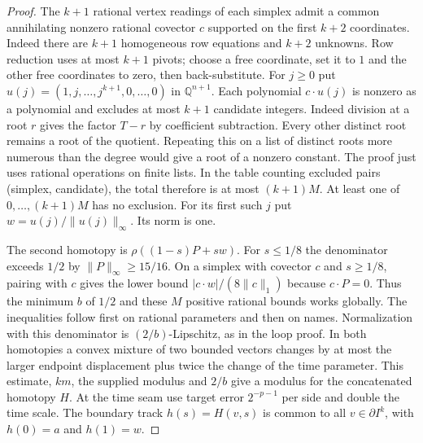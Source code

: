 \begin{proof}
The $k+1$ rational vertex readings of each simplex admit a common
annihilating nonzero rational covector $c$ supported on the first $k+2$
coordinates. Indeed there are $k+1$ homogeneous row equations and $k+2$
unknowns. Row reduction uses at most $k+1$ pivots; choose a free coordinate,
set it to $1$ and the other free coordinates to zero, then back-substitute.
For $j\ge0$ put $u(j)=(1,j,\ldots,j^{k+1},0,\ldots,0)$ in
$\mathbb Q^{n+1}$. Each polynomial $c\cdot u(j)$ is nonzero as a
polynomial and excludes at most $k+1$ candidate integers. Indeed division
at a root $r$ gives the factor $T-r$ by coefficient subtraction. Every
other distinct root remains a root of the quotient. Repeating this on a
list of distinct roots more numerous than the degree would give a root of
a nonzero constant. The proof just uses rational operations on finite
lists. In the table counting excluded pairs (simplex, candidate), the
total therefore is at most $(k+1)M$. At least one of
$0,\ldots,(k+1)M$ has no exclusion. For its first such $j$ put
$w=u(j)/\|u(j)\|_\infty$. Its norm is one.

The second homotopy is $\rho((1-s)P+sw)$. For $s\le1/8$ the
denominator exceeds $1/2$ by $\|P\|_\infty\ge15/16$. On a simplex with
covector $c$ and $s\ge1/8$, pairing with $c$ gives the lower bound
$|c\cdot w|/(8\|c\|_1)$ because $c\cdot P=0$. Thus the minimum $b$ of
$1/2$ and these $M$ positive rational bounds works globally. The
inequalities follow first on rational parameters and then on names.
Normalization with this denominator is $(2/b)$-Lipschitz, as in the loop
proof. In both homotopies a convex mixture of two bounded vectors changes
by at most the larger endpoint displacement plus twice the change of the
time parameter. This estimate, $km$, the supplied modulus and $2/b$
give a modulus for the concatenated homotopy $H$. At the time seam use
target error $2^{-p-1}$ per side and double the time scale. The boundary
track $h(s)=H(v,s)$ is common to all $v\in\partial I^k$, with
$h(0)=a$ and $h(1)=w$.


\end{proof}
